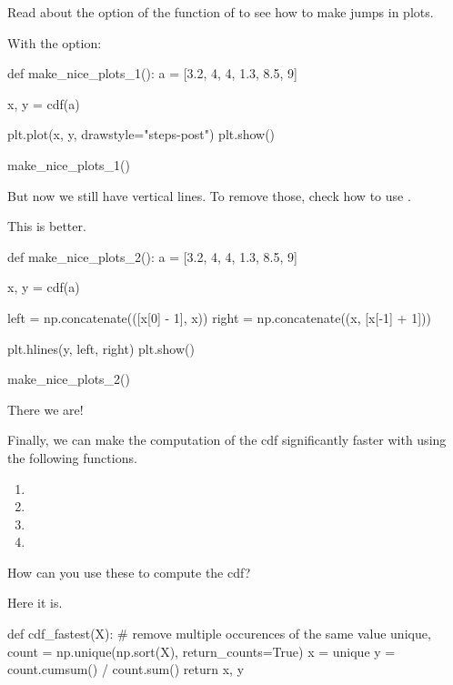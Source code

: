 \begin{exercise}
Read about the  option of the  function of  to see how to make jumps in plots.
\begin{solution}
With the  option:
\begin{pyverbatim}
def make_nice_plots_1():
    a = [3.2, 4, 4, 1.3, 8.5, 9]

    x, y = cdf(a)

    plt.plot(x, y, drawstyle="steps-post")
    plt.show()


make_nice_plots_1()
\end{pyverbatim}
\end{solution}
\end{exercise}

\begin{exercise}
But now we still have vertical lines. To remove those, check how to use .
\begin{solution}
This is better.
\begin{pyverbatim}
def make_nice_plots_2():
    a = [3.2, 4, 4, 1.3, 8.5, 9]

    x, y = cdf(a)

    left = np.concatenate(([x[0] - 1], x))
    right = np.concatenate((x, [x[-1] + 1]))

    plt.hlines(y, left, right)
    plt.show()


make_nice_plots_2()
\end{pyverbatim}

There we are!
  \end{solution}
\end{exercise}


\begin{exercise}
Finally, we can make the computation of the cdf significantly faster with using the following  functions.
\begin{enumerate}
\item {}
\item {}
\item {}
\item {}
\end{enumerate}
How can you use these to compute the cdf?
\begin{solution}
Here it is.
\begin{pyverbatim}
def cdf_fastest(X):
    # remove multiple occurences of the same value
    unique, count = np.unique(np.sort(X), return_counts=True)
    x = unique
    y = count.cumsum() / count.sum()
    return x, y
\end{pyverbatim}

\end{solution}
\end{exercise}

